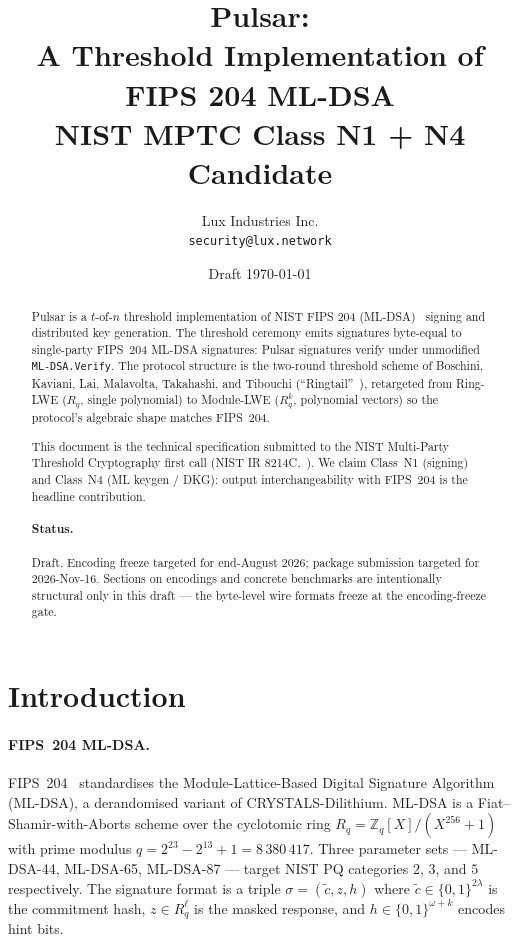 \documentclass[11pt,a4paper]{article}
\title{Pulsar:\\
       \large A Threshold Implementation of FIPS 204 ML-DSA\\
       NIST MPTC Class N1 + N4 Candidate}
\author{Lux Industries Inc.\\
        \texttt{security@lux.network}}
\date{Draft \today}
\theoremstyle{definition}
\theoremstyle{remark}
\newcommand{\Rq}{R_q}
\newcommand{\Zq}{\mathbb{Z}_q}
\begin{document}
\maketitle

\begin{abstract}
Pulsar is a $t$-of-$n$ threshold implementation of NIST FIPS 204
(ML-DSA)~\cite{nist-fips204} signing and distributed key generation.
The threshold ceremony emits signatures byte-equal to single-party
FIPS~204 ML-DSA signatures: Pulsar signatures verify under
unmodified \texttt{ML-DSA.Verify}. The protocol structure is the
two-round threshold scheme of Boschini, Kaviani, Lai, Malavolta,
Takahashi, and Tibouchi (``Ringtail''~\cite{boschini2024ringtail}), retargeted
from Ring-LWE ($\Rq$, single polynomial) to Module-LWE ($\Rq^k$,
polynomial vectors) so the protocol's algebraic shape matches
FIPS~204.

This document is the technical specification submitted to the NIST
Multi-Party Threshold Cryptography first call (NIST IR
8214C,~\cite{nist-ir-8214c}). We claim Class~N1 (signing) and Class~N4
(ML keygen / DKG): output interchangeability with FIPS~204 is the
headline contribution.

\paragraph{Status.} Draft. Encoding freeze targeted for end-August
2026; package submission targeted for 2026-Nov-16. Sections on
encodings and concrete benchmarks are intentionally structural only
in this draft --- the byte-level wire formats freeze at the
encoding-freeze gate.
\end{abstract}

\tableofcontents

\section{Introduction}

\paragraph{FIPS~204 ML-DSA.}
FIPS~204~\cite{nist-fips204} standardises the Module-Lattice-Based
Digital Signature Algorithm (ML-DSA), a derandomised variant of
CRYSTALS-Dilithium. ML-DSA is a Fiat--Shamir-with-Aborts scheme over
the cyclotomic ring $\Rq = \Zq[X]/(X^{256}+1)$ with prime modulus
$q = 2^{23} - 2^{13} + 1 = 8\,380\,417$. Three parameter sets ---
ML-DSA-44, ML-DSA-65, ML-DSA-87 --- target NIST PQ categories
$2$, $3$, and $5$ respectively. The signature format is a triple
$\sigma = (\tilde c, z, h)$ where $\tilde c \in \{0,1\}^{2\lambda}$
is the commitment hash, $z \in \Rq^\ell$ is the masked response, and
$h \in \{0,1\}^{\omega + k}$ encodes hint bits.
\end{document}
